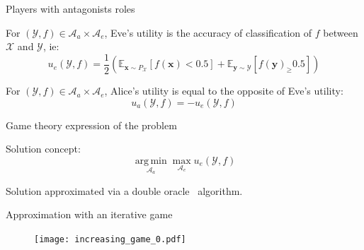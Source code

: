 \documentclass[10pt,aspectratio=169]{beamer}
\DeclareMathOperator*{\argmin}{arg\,min} %
\begin{document}
\begin{frame}{Players with antagonists roles}

    \begin{tcolorbox}[colback=lightgreen,colframe=greentheme,title=\textbf{Definition} (Eve's utility)]
        For $(\mathcal{Y}, f)  \in \mathcal{A}_a \times \mathcal{A}_e$, Eve's utility is the accuracy of classification of $f$ between $\mathcal{X}$ and $\mathcal{Y}$, ie:
            \begin{equation}
                u_e(\mathcal{Y}, f) = \frac{1}{2} \left(\mathbb{E}_{\mathbf{x}\sim P_{\mathcal{X}}}[f(\mathbf{x}) < 0.5] + \mathbb{E}_{\mathbf{y} \sim \mathcal{Y}}[f(\mathbf{y})_ \geq 0.5] \right)
            \end{equation}
    \end{tcolorbox}

    \pause
    \begin{tcolorbox}[colback=lightgreen,colframe=greentheme,title=\textbf{Definition} (Alice's utility)]
        For $(\mathcal{Y}, f)  \in \mathcal{A}_a \times \mathcal{A}_e$, Alice's utility is equal to the opposite of Eve's utility:
            \begin{equation}
                u_a(\mathcal{Y}, f) = - u_e(\mathcal{Y}, f)
            \end{equation}
    \end{tcolorbox}

\end{frame}


\begin{frame}{Game theory expression of the problem}

    Solution concept:
    \alert{
        \Large{
            \begin{equation*}
            \underset{\mathcal{A}_a}{\argmin} \max_{\mathcal{A}_e} u_e(\mathcal{Y}, f)
            \end{equation*}
        }
    }

    \pause
    Solution approximated via a \alert{double oracle}~ algorithm.
    
\end{frame}

    
\begin{frame}{Approximation with an iterative game}
    \begin{figure}
        \texttt{[image: increasing\_game\_0.pdf]}
    \end{figure}
\end{frame}
\end{document}

